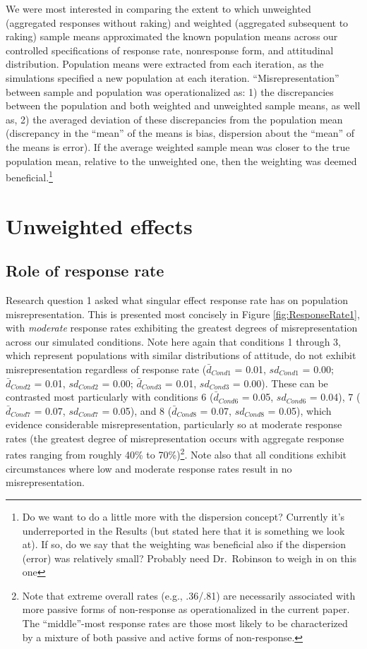 \documentclass[
  man,mask]{apa7}
\begin{document}
We were most interested in comparing the extent to which unweighted (aggregated responses without raking) and weighted (aggregated subsequent to raking) sample means approximated the known population means across our controlled specifications of response rate, nonresponse form, and attitudinal distribution. Population means were extracted from each iteration, as the simulations specified a new population at each iteration. ``Misrepresentation'' between sample and population was operationalized as: 1) the discrepancies between the population and both weighted and unweighted sample means, as well as, 2) the averaged deviation of these discrepancies from the population mean (discrepancy in the ``mean'' of the means is bias, dispersion about the ``mean'' of the means is error). If the average weighted sample mean was closer to the true population mean, relative to the unweighted one, then the weighting was deemed beneficial.\footnote{Do we want to do a little more with the dispersion concept? Currently it's underreported in the Results (but stated here that it is something we look at). If so, do we say that the weighting was beneficial also if the dispersion (error) was relatively small? Probably need Dr.~Robinson to weigh in on this one}

\section{Unweighted effects}\label{unweighted-effects}

\subsection{Role of response rate}\label{role-of-response-rate}

Research question 1 asked what singular effect response rate has on population misrepresentation. This is presented most concisely in Figure \ref{fig:ResponseRate1}, with \emph{moderate} response rates exhibiting the greatest degrees of misrepresentation across our simulated conditions. Note here again that conditions 1 through 3, which represent populations with similar distributions of attitude, do not exhibit misrepresentation regardless of response rate (\(\bar{d}_{Cond1}\) = 0.01, \(sd_{Cond1}\) = 0.00; \(\bar{d}_{Cond2}\) = 0.01, \(sd_{Cond2}\) = 0.00; \(\bar{d}_{Cond3}\) = 0.01, \(sd_{Cond3}\) = 0.00). These can be contrasted most particularly with conditions 6 (\(\bar{d}_{Cond6}\) = 0.05, \(sd_{Cond6}\) = 0.04), 7 (\(\bar{d}_{Cond7}\) = 0.07, \(sd_{Cond7}\) = 0.05), and 8 (\(\bar{d}_{Cond8}\) = 0.07, \(sd_{Cond8}\) = 0.05), which evidence considerable misrepresentation, particularly so at moderate response rates (the greatest degree of misrepresentation occurs with aggregate response rates ranging from roughly 40\% to 70\%)\footnote{Note that extreme overall rates (e.g., .36/.81) are necessarily associated with more passive forms of non-response as operationalized in the current paper. The ``middle''-most response rates are those most likely to be characterized by a mixture of both passive and active forms of non-response.}. Note also that all conditions exhibit circumstances where low and moderate response rates result in no misrepresentation.
\end{document}
